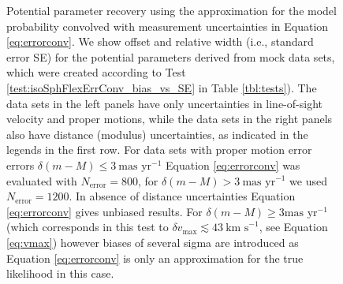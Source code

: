 
\begin{figure}
\caption{Potential parameter recovery using the approximation for the model probability convolved with measurement uncertainties in Equation \ref{eq:errorconv}. We show  \pdf{} offset and relative width (i.e., standard error SE) for the potential parameters derived from mock data sets, which were created according to Test \ref{test:isoSphFlexErrConv_bias_vs_SE} in Table \ref{tbl:tests}). The data sets in the left panels have only uncertainties in line-of-sight velocity and proper motions, while the data sets in the right panels also have distance (modulus) uncertainties, as indicated in the legends in the first row. For data sets with proper motion error errors $\delta(m-M) \leq 3 \ \text{mas yr}^{-1}$ Equation \ref{eq:errorconv} was evaluated with $N_\text{error}=800$, for $\delta(m-M) > 3 \ \text{mas yr}^{-1}$ we used $N_\text{error}=1200$. In absence of distance uncertainties Equation \ref{eq:errorconv} gives unbiased results. For $\delta(m-M) \geq 3 \text{mas yr}^{-1}$ (which corresponds in this test to $\delta v_\text{max} \lesssim 43 \ \text{km s}^{-1}$, see Equation \ref{eq:vmax}) however biases of several sigma are introduced as Equation \ref{eq:errorconv} is only an approximation for the true likelihood in this case.}
\label{fig:isoSphFlexErrConv_bias_vs_SE}
\end{figure}


\begin{figure}
\caption{}
\label{fig:???}
\end{figure}




